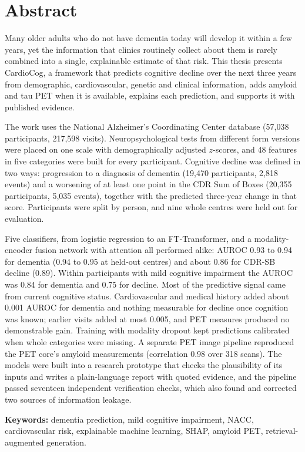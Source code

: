\chapter*{Abstract}

Many older adults who do not have dementia today will develop it within a few years, yet the information that clinics routinely collect about them is rarely combined into a single, explainable estimate of that risk. This thesis presents CardioCog, a framework that predicts cognitive decline over the next three years from demographic, cardiovascular, genetic and clinical information, adds amyloid and tau PET when it is available, explains each prediction, and supports it with published evidence.

The work uses the National Alzheimer's Coordinating Center database (57,038 participants, 217,598 visits). Neuropsychological tests from different form versions were placed on one scale with demographically adjusted $z$-scores, and 48 features in five categories were built for every participant. Cognitive decline was defined in two ways: progression to a diagnosis of dementia (19,470 participants, 2,818 events) and a worsening of at least one point in the CDR Sum of Boxes (20,355 participants, 5,035 events), together with the predicted three-year change in that score. Participants were split by person, and nine whole centres were held out for evaluation.

Five classifiers, from logistic regression to an FT-Transformer, and a modality-encoder fusion network with attention all performed alike: AUROC 0.93 to 0.94 for dementia (0.94 to 0.95 at held-out centres) and about 0.86 for CDR-SB decline (0.89). Within participants with mild cognitive impairment the AUROC was 0.84 for dementia and 0.75 for decline. Most of the predictive signal came from current cognitive status. Cardiovascular and medical history added about 0.001 AUROC for dementia and nothing measurable for decline once cognition was known; earlier visits added at most 0.005, and PET measures produced no demonstrable gain. Training with modality dropout kept predictions calibrated when whole categories were missing. A separate PET image pipeline reproduced the PET core's amyloid measurements (correlation 0.98 over 318 scans). The models were built into a research prototype that checks the plausibility of its inputs and writes a plain-language report with quoted evidence, and the pipeline passed seventeen independent verification checks, which also found and corrected two sources of information leakage.

\medskip
\noindent\textbf{Keywords:} dementia prediction, mild cognitive impairment, NACC, cardiovascular risk, explainable machine learning, SHAP, amyloid PET, retrieval-augmented generation.
